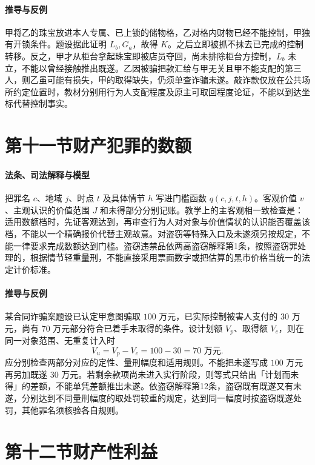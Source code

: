 \paragraph{推导与反例}
甲将乙的珠宝放进本人专属、已上锁的储物格，乙对格内财物已经不能控制，甲独有开锁条件。题设据此证明 $L_b,G_a$，故得 $K$。之后立即被抓不抹去已完成的控制转移。反之，甲才从柜台拿起珠宝即被店员夺回，尚未排除柜台方控制，$L_b$ 未立，不能以曾经接触推出既遂。乙因被骗把款汇给与甲无关且甲不能支配的第三人，则乙虽可能有损失，甲的取得缺失，仍须单查诈骗未遂。敲诈款仅放在公共场所约定位置时，教材分别用行为人支配程度及原主可取回程度论证，不能以到达坐标代替控制事实。

\section{第十一节\quad 财产犯罪的数额}

\paragraph{法条、司法解释与模型}
把罪名 $c$、地域 $j$、时点 $t$ 及具体情节 $h$ 写进门槛函数 $q(c,j,t,h)$。客观价值 $v$、主观认识的价值范围 $J$ 和未得部分分别记账。教学上的主客观相一致检查是：适用数额档时，先证客观达到，再审查行为人对对象与价值情状的认识能否覆盖该档，不能以一个精确报价代替主观故意。对盗窃等特殊入口及未遂须另按规定，不能一律要求完成数额达到门槛。盗窃违禁品依两高盗窃解释第1条，按照盗窃罪处理的，根据情节轻重量刑，不能直接采用票面数字或把估算的黑市价格当统一的法定计价标准。

\paragraph{推导与反例}
某合同诈骗案题设已认定甲意图骗取 $100$ 万元，已实际控制被害人支付的 $30$ 万元，尚有 $70$ 万元部分符合已着手未取得的条件。设计划额 $V_p$、取得额 $V_c$，则在同一对象范围、无重复计入时
\[
 V_u=V_p-V_c=100-30=70\text{ 万元}.
\]
应分别检查两部分对应的定性、量刑幅度和适用规则。不能把未遂写成 $100$ 万元再另加既遂 $30$ 万元。若剩余款项尚未进入实行阶段，则等式只给出「计划而未得」的差额，不能单凭差额推出未遂。依盗窃解释第12条，盗窃既有既遂又有未遂，分别达到不同量刑幅度的取处罚较重的规定，达到同一幅度时按盗窃既遂处罚，其他罪名须核验各自规则。

\section{第十二节\quad 财产性利益}

